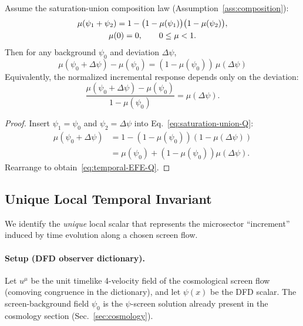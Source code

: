 \begin{theorem}\label{thm:temporal-deviation-Q}
Assume the saturation-union composition law (Assumption~\ref{ass:composition}):
\begin{gather}
\mu(\psi_1+\psi_2)=1-\bigl(1-\mu(\psi_1)\bigr)\bigl(1-\mu(\psi_2)\bigr),
\label{eq:saturation-union-Q}\\
\mu(0)=0,\qquad 0\le \mu<1. \notag
\end{gather}
Then for any background $\psi_0$ and deviation $\Delta\psi$,
\begin{equation}
\boxed{\mu(\psi_0+\Delta\psi)-\mu(\psi_0)=(1-\mu(\psi_0))\,\mu(\Delta\psi)}
\label{eq:temporal-EFE-Q}
\end{equation}
Equivalently, the normalized incremental response depends only on the deviation:
\begin{equation}
\frac{\mu(\psi_0+\Delta\psi)-\mu(\psi_0)}{1-\mu(\psi_0)}=\mu(\Delta\psi).
\label{eq:temporal-EFE-normalized}
\end{equation}
\end{theorem}
\begin{proof}
Insert $\psi_1=\psi_0$ and $\psi_2=\Delta\psi$ into Eq.~\eqref{eq:saturation-union-Q}:
\begin{align*}
\mu(\psi_0+\Delta\psi)&=1-(1-\mu(\psi_0))(1-\mu(\Delta\psi))\\
&=\mu(\psi_0)+(1-\mu(\psi_0))\mu(\Delta\psi).
\end{align*}
Rearrange to obtain~\eqref{eq:temporal-EFE-Q}.
\end{proof}

\subsection{Unique Local Temporal Invariant}

We identify the \emph{unique} local scalar that represents the microsector ``increment'' induced by time evolution along a chosen screen flow.

\paragraph{Setup (DFD observer dictionary).}
Let $u^\mu$ be the unit timelike 4-velocity field of the cosmological screen flow (comoving congruence in the dictionary), and let $\psi(x)$ be the DFD scalar.
The screen-background field $\psi_0$ is the $\psi$-screen solution already present in the cosmology section (Sec.~\ref{sec:cosmology}).

